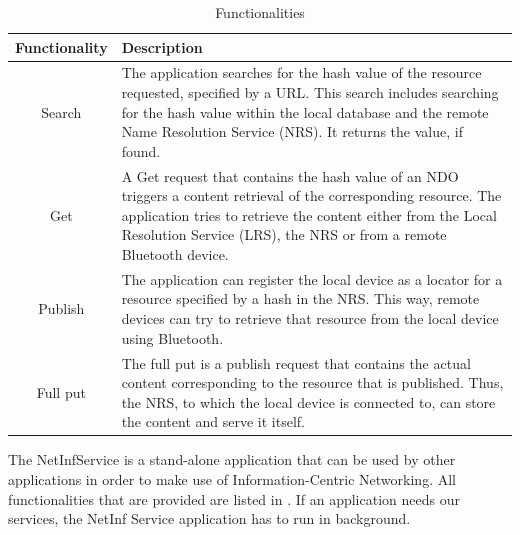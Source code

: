 \begin{table}
\centering
 \begin{tabular}{|c|p{10cm}|}\hline
  Functionality	& Description \\\hline
  Search	& The application searches for the hash value of the resource requested, specified by a URL. This search includes
		  searching for the hash value within the local database and the remote Name Resolution Service (NRS).
		  It returns the value, if found.\\\hline
  Get		& A Get request that contains the hash value of an NDO triggers a content retrieval of the
		  corresponding resource. The application tries to retrieve the content either from the Local Resolution Service (LRS), the NRS
		  or from a remote Bluetooth device.\\\hline
  Publish	& The application can register the local device as a locator for a resource specified by a hash in the NRS. This way, remote
		  devices can try to retrieve that resource from the local device using Bluetooth. \\\hline
  Full put	& The full put is a publish request that contains the actual content corresponding to the resource that is published. Thus,
		  the NRS, to which the local device is connected to, can store the content and serve it itself.\\\hline
		  
 \end{tabular}
  \caption{Functionalities}\label{tab:netinffunctionalities}
\end{table}

The NetInfService is a stand-alone application that can be used by other
applications in order to make use of Information-Centric Networking. All functionalities
that are provided are listed in . If an application
needs our services, the NetInf Service application has to run in background.\\


